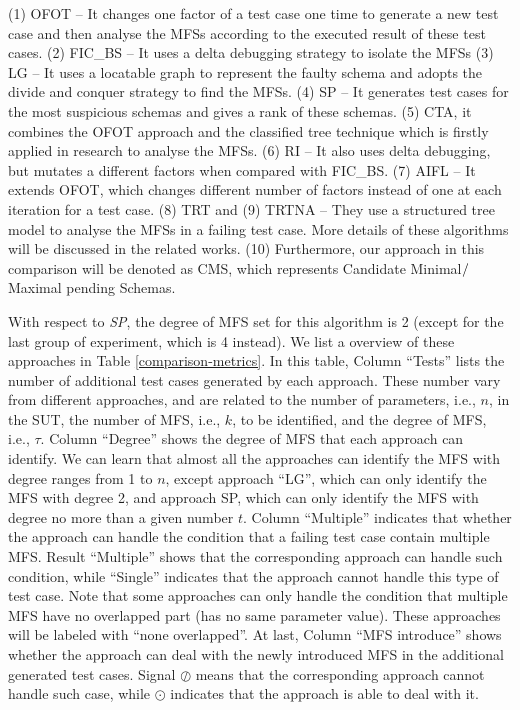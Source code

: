 \documentclass{sig-alternate-05-2015}
\begin{document}
{{{(1) OFOT \cite{nie2011minimal} -- It changes one factor of a test case one time to generate a new test case and then analyse the MFSs according to the executed result of these test cases. (2) FIC\_BS \cite{zhang2011characterizing} -- It uses a delta debugging strategy to isolate the MFSs (3) LG \cite{martinez2008algorithms,martinez2009locating} -- It uses a locatable graph to represent the faulty schema and adopts the divide and conquer strategy to find the MFSs. (4) SP\cite{ghandehari2012identifying} -- It generates test cases for the most suspicious schemas and gives a rank of these schemas. (5) CTA\cite{shakya2012isolating}, it combines the OFOT approach and the classified tree technique which is firstly applied in research \cite{yilmaz2006covering}  to analyse the MFSs. (6) RI \cite{li2012improved} -- It also uses delta debugging, but mutates a different factors  when compared with FIC\_BS. (7) AIFL \cite{wang2010adaptive} -- It extends OFOT, which changes different number of factors instead of one at each iteration for a test case. (8) TRT \cite{niu2013identifying} and (9) TRTNA \cite{niu2013identifying} --  They use a structured tree model to analyse the MFSs in a failing test case.  More details of these algorithms will be discussed in the related works. (10) Furthermore, our approach in this comparison will be denoted as CMS, which represents Candidate Minimal$\//$Maximal pending Schemas.

With respect to \emph{SP}, the degree of MFS set for this algorithm is 2 (except for the last group of experiment, which is 4 instead). We list a overview of these approaches in Table \ref{comparison-metrics}. In this table, Column ``Tests'' lists the number of additional test cases generated by each approach. These number vary from different approaches, and are related to the number of parameters, i.e., $n$, in the SUT, the number of MFS, i.e., $k$, to be identified, and the degree of MFS, i.e., $\tau$. Column ``Degree'' shows the degree of MFS that each approach can identify. We can learn that almost all the approaches can identify the MFS with degree ranges from 1 to $n$, except approach ``LG'', which can only identify the MFS with degree 2, and approach SP, which can only identify the MFS with degree no more than a given number $t$.  Column ``Multiple'' indicates that whether the approach can handle the condition that a failing test case contain multiple MFS. Result ``Multiple'' shows that the corresponding approach can handle such condition, while ``Single'' indicates that the approach cannot handle this type of test case. Note that some approaches can only handle the condition that multiple MFS have no overlapped part (has no same parameter value). These approaches will be labeled with ``none overlapped''.
At last, Column ``MFS introduce'' shows whether the approach can deal with the newly introduced MFS in the additional generated test cases. Signal $\oslash$ means that the corresponding approach cannot handle such case, while $\odot$ indicates that the approach is able to deal with it.

}}}
\end{document}
